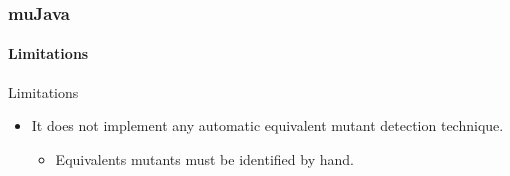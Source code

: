 \begin{frame}[hasprev=true, hasnext=false]
\frametitle{muJava}
\framesubtitle{Limitations}

\begin{block:fact}{Limitations}
\begin{itemize}
	\item It does not implement any automatic equivalent mutant detection
	technique.
	\begin{itemize}
		\item Equivalents mutants must be identified by hand.
	\end{itemize}
\end{itemize}
\end{block:fact}
\end{frame}


